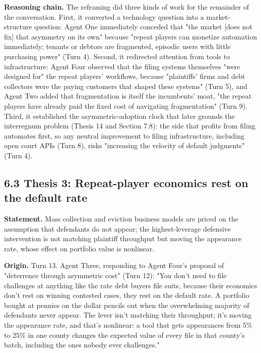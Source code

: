 \documentclass[sigconf,nonacm=true]{acmart}
\begin{document}
\textbf{Reasoning chain.} The reframing did three kinds of work for the remainder of the conversation. First, it converted a technology question into a market-structure question: Agent One immediately conceded that "the market [does not fix] that asymmetry on its own" because "repeat players can monetize automation immediately; tenants or debtors are fragmented, episodic users with little purchasing power" (Turn 4). Second, it redirected attention from tools to infrastructure: Agent Four observed that the filing systems themselves "were designed for" the repeat players' workflows, because "plaintiffs' firms and debt collectors were the paying customers that shaped these systems" (Turn 5), and Agent Two added that fragmentation is itself the incumbents' moat,  "the repeat players have already paid the fixed cost of navigating fragmentation" (Turn 9). Third, it established the asymmetric-adoption clock that later grounds the interregnum problem (Thesis 14 and Section 7.8): the side that profits from filing automates first, so any neutral improvement to filing infrastructure,  including open court APIs (Turn 8),  risks "increasing the velocity of default judgments" (Turn 4).

\subsection{6.3 Thesis 3: Repeat-player economics rest on the default rate}

\textbf{Statement.} Mass collection and eviction business models are priced on the assumption that defendants do not appear; the highest-leverage defensive intervention is not matching plaintiff throughput but moving the appearance rate, whose effect on portfolio value is nonlinear.

\textbf{Origin.} Turn 13. Agent Three, responding to Agent Four's proposal of "deterrence through asymmetric cost" (Turn 12): "You don't need to file challenges at anything like the rate debt buyers file suits, because their economics don't rest on winning contested cases,  they rest on the default rate. A portfolio bought at pennies on the dollar pencils out when the overwhelming majority of defendants never appear. The lever isn't matching their throughput; it's moving the appearance rate, and that's nonlinear: a tool that gets appearances from 5\% to 25\% in one county changes the expected value of every file in that county's batch, including the ones nobody ever challenges."
\end{document}
